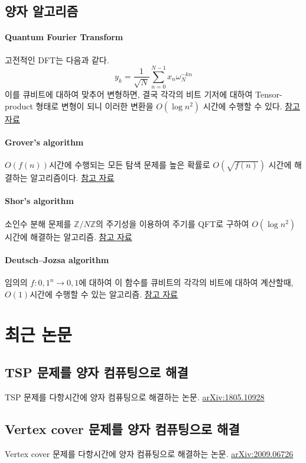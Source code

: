 \documentclass{article}
\begin{document}
    \subsection{양자 알고리즘}
        \paragraph{Quantum Fourier Transform}
        고전적인 DFT는 다음과 같다.
        \begin{equation}
            y_{k} = \frac{1}{\sqrt{N}}{\sum_{n=0}^{N-1} x_{n}\omega_{N}^{-kn}}
        \end{equation}
        이를 큐비트에 대하여 맞추어 변형하면, 결국 각각의 비트 기저에 대하여 Tensor-product 형태로 변형이 되니
        이러한 변환을 $O(\log{n}^{2})$ 시간에 수행할 수 있다. \href{https://en.wikipedia.org/wiki/Quantum_Fourier_transform}{참고 자료}
        \paragraph{Grover's algorithm}
        $O(f(n))$시간에 수행되는 모든 탐색 문제를 높은 확률로 $O(\sqrt{f(n)})$ 시간에
        해결하는 알고리즘이다. \href{https://en.wikipedia.org/wiki/Grover%27s_algorithm}{참고 자료}
        \paragraph{Shor's algorithm}
        소인수 분해 문제를 $\mathbb{Z}/N\mathbb{Z}$의 주기성을 이용하여 주기를 QFT로 구하여 $O(\log{n}^{2})$ 시간에 해결하는 알고리즘. \href{https://en.wikipedia.org/wiki/Shor%27s_algorithm}{참고 자료}
        \paragraph{Deutsch–Jozsa algorithm}
        임의의 $f: {0,1}^{n} \to {0,1}$에 대하여 이 함수를 큐비트의 각각의 비트에 대하여 계산할때, $O(1)$시간에 수행할 수 있는 알고리즘. \href{https://en.wikipedia.org/wiki/Deutsch%E2%80%93Jozsa_algorithm}{참고 자료}
    \section{최근 논문}
    \subsection{TSP 문제를 양자 컴퓨팅으로 해결}
    TSP 문제를 다항시간에 양자 컴퓨팅으로 해결하는 논문.
    \href{https://arxiv.org/abs/1805.10928}{arXiv:1805.10928}
    \subsection{Vertex cover 문제를 양자 컴퓨팅으로 해결}
    Vertex cover 문제를 다항시간에 양자 컴퓨팅으로 해결하는 논문.
    \href{https://arxiv.org/abs/2009.06726}{arXiv:2009.06726}
\end{document}
